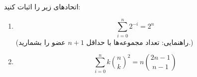 \EXERCISE
اتحادهای زیر را اثبات کنید:
\begin{enumerate}
\item
$$\sum_{i=0}^{n} 2^{-i} = 2^n$$
(راهنمایی: تعداد مجموعه‌ها با حداقل
$n + 1$
عضو را بشمارید.)
\item
$$\sum_{i=0}^{n}k {\binom{n}{k}}^2 = n \binom{2n - 1}{n - 1}$$
\end{enumerate}